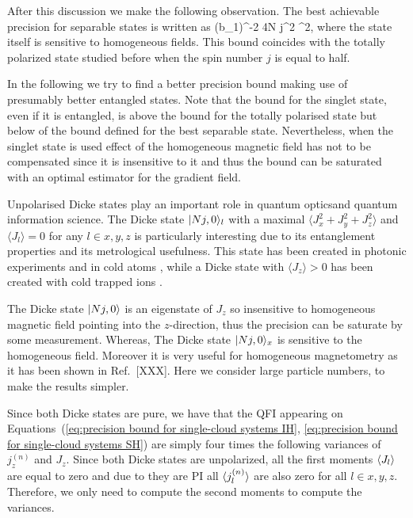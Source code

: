 After this discussion we make the following observation. The best achievable precision for separable states is written as
\be
(\Delta b_1)^{-2} \leqslant 4N j^2 \sigma^2,
\label{eq:best_separable}
\ee
where the state itself is sensitive to homogeneous fields.
This bound coincides with the totally polarized state studied before when the spin number $j$ is equal to half.
\label{obs:precision bound for separable states}

In the following we try to find a better precision bound making use of presumably better entangled states.
Note that the bound for the singlet state, even if it is entangled, is above the bound for the totally polarised state but below of the bound defined for the best separable state.
Nevertheless, when the singlet state is used effect of the homogeneous magnetic field has not to be compensated since it is insensitive to it and thus the bound can be saturated with an optimal estimator for the gradient field.


Unpolarised Dicke states play an important role in quantum opticsand quantum information science.
The Dicke state $\vert Nj,0 \rangle_l$ with a maximal $\langle J_x^2+J_y^2+J_z^2 \rangle$ and $\langle J_l\rangle=0$ for any $l\in x,y,z$ is particularly interesting due to its entanglement properties and its metrological usefulness.
This state has been created in photonic experiments \cite{Kiesel2007,Wieczorek2009,Chiuri2012} and in cold atoms \cite{Luecke2011,Hamley2012}, while a Dicke state with $\langle J_z\rangle>0$ has been created with cold trapped ions \cite{haeffner2005}.

The Dicke state $\vert Nj, 0 \rangle$ is an eigenstate of $J_z$ so insensitive to homogeneous magnetic field pointing into the $z$-direction, thus the precision can be saturate by some measurement.
Whereas, The Dicke state $\vert Nj, 0 \rangle_x$ is sensitive to the homogeneous field.
Moreover it is very useful for homogeneous magnetometry as it has been shown in Ref.~[XXX].
Here we consider large particle numbers, to make the results simpler.

Since both Dicke states are pure, we have that
the QFI appearing on Equations~(\ref{eq:precision bound for single-cloud
systems IH}, \ref{eq:precision bound for single-cloud
systems SH}) are simply four times the following variances of $j_z^{(n)}$ and $J_z$.
Since both Dicke states are unpolarized, all the first moments $\langle J_l \rangle$ are equal to zero and due to they are PI all $\langle j_l^{(n)} \rangle$ are also zero for all $l\in x,y,z$.
Therefore, we only need to compute the second moments to compute the variances.


